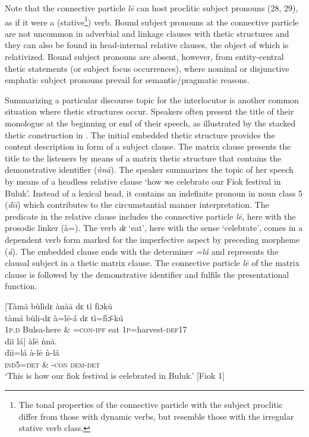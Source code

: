 \documentclass[output=paper]{langsci/langscibook}
\begin{document}
Note that the connective particle \textit{l\={e} }can host proclitic subject pronouns (28, 29), as if it were a (stative\footnote{ The tonal properties of the connective particle with the subject proclitic differ from those with dynamic verbs, but resemble those with the irregular stative verb class.}) verb. Bound subject pronouns at the connective particle are not uncommon in adverbial and linkage clauses with thetic structures and they can also be found in head-internal relative clauses, the object of which is relativized. Bound subject pronouns are absent, however, from entity-central thetic statements (or subject focus occurrences), where nominal or disjunctive emphatic subject pronouns prevail for semantic/pragmatic reasons.

Summarizing a particular discourse topic for the interlocutor is another common situation where thetic structures occur. Speakers often present the title of their monologue at the beginning or end of their speech, as illustrated by the stacked thetic construction in . The initial embedded thetic structure provides the content description in form of a subject clause. The matrix clause presents the title to the listeners by means of a matrix thetic structure that contains the demonstrative identifier (\textit{ǹn\={a}}). The speaker summarizes the topic of her speech by means of a headless relative clause ‘how we celebrate our Fiok festival in Buluk’. Instead of a lexical head, it contains an indefinite pronoun in noun class 5 (\textit{d\={i}\={i}}) which contributes to the circumstantial manner interpretation. The predicate in the relative clause includes the connective particle \textit{l\={e}},\textit{ }here with the prosodic linker (à=). The verb \textit{dɛ}\textit{}‘eat’, here with the sense ‘celebrate’, comes in a dependent verb form marked for the imperfective aspect by preceding morpheme (\textit{á}). The embedded clause ends with the determiner \textit{=lá }and represents the clausal subject in a thetic matrix clause. The connective particle \textit{l\={e} }of the matrix clause is followed by the demonstrative identifier and fulfils the presentational function.

\ea
\glll \textup{}  \textup{[}Tàm\={a}  bùlìdɛ    ànà\={a}    dɛ  tì   fìɔk\={u}\\
  \textup{   tàmá  bùli-dɛ    à=l\={e}-á    dɛ  tì=fìɔ}\textup{\={ }}\textup{{}-kú}\\
       1\textsc{p}.\textsc{d}  Bulsa-here      \& =\textsc{con}{}-\textsc{ipf}    eat  1\textsc{p}=harvest-\textsc{def}17  \\
\glll   d\={i}\={i}  lá\textup{]  }àl\={e}    ǹn\={a}.\\
  \textup{  d\={i}i=lá    à-l\={e}    ǹ-lá}\\
     \textsc{  ind5=det     \& -con    dem-det}\\
\glt ‘This is how our fiok festival is celebrated in Buluk.’ [Fiok 1]
\z
\end{document}
